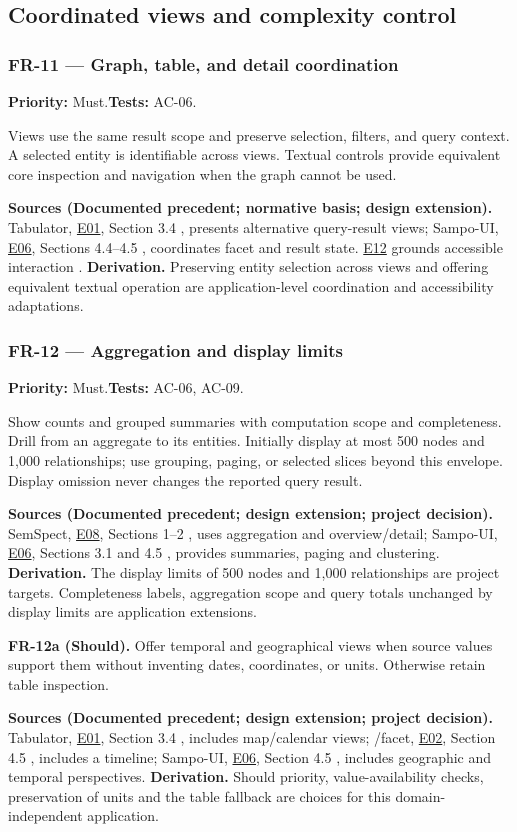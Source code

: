 \documentclass[11pt,a4paper]{article}
\newcommand{\req}[4]{\subsubsection*{#1 --- #2}\phantomsection\label{req:#1}\textbf{Priority:} #3.\quad\textbf{Tests:} #4.\par}
\newcommand{\origin}[3]{\par{\small\textbf{Sources (#1).} #2 \textbf{Derivation.} #3\par}}
\newcommand{\evidence}[1]{\hyperlink{evidence:#1}{#1}}
\begin{document}
\subsection{Coordinated views and complexity control}
\par\noindent\begin{minipage}{\linewidth}
\req{FR-11}{Graph, table, and detail coordination}{Must}{AC-06}
Views use the same result scope and preserve selection, filters, and query context. A selected entity is identifiable across views. Textual controls provide equivalent core inspection and navigation when the graph cannot be used.
\origin{Documented precedent; normative basis; design extension}{Tabulator, \evidence{E01}, Section 3.4 \citep{tabulator}, presents alternative query-result views; Sampo-UI, \evidence{E06}, Sections 4.4--4.5 \citep{sampoui}, coordinates facet and result state. \evidence{E12} grounds accessible interaction \citep{wcag}.}{Preserving entity selection across views and offering equivalent textual operation are application-level coordination and accessibility adaptations.}
\end{minipage}\par
\par\noindent\begin{minipage}{\linewidth}
\req{FR-12}{Aggregation and display limits}{Must}{AC-06, AC-09}
Show counts and grouped summaries with computation scope and completeness. Drill from an aggregate to its entities. Initially display at most 500 nodes and 1,000 relationships; use grouping, paging, or selected slices beyond this envelope. Display omission never changes the reported query result.
\origin{Documented precedent; design extension; project decision}{SemSpect, \evidence{E08}, Sections 1--2 \citep{semspect}, uses aggregation and overview/detail; Sampo-UI, \evidence{E06}, Sections 3.1 and 4.5 \citep{sampoui}, provides summaries, paging and clustering.}{The display limits of 500 nodes and 1,000 relationships are project targets. Completeness labels, aggregation scope and query totals unchanged by display limits are application extensions.}
\end{minipage}\par
\par\noindent\begin{minipage}{\linewidth}
\textbf{FR-12a (Should).} Offer temporal and geographical views when source values support them without inventing dates, coordinates, or units. Otherwise retain table inspection.
\origin{Documented precedent; design extension; project decision}{Tabulator, \evidence{E01}, Section 3.4 \citep{tabulator}, includes map/calendar views; /facet, \evidence{E02}, Section 4.5 \citep{facet}, includes a timeline; Sampo-UI, \evidence{E06}, Section 4.5 \citep{sampoui}, includes geographic and temporal perspectives.}{Should priority, value-availability checks, preservation of units and the table fallback are choices for this domain-independent application.}
\end{minipage}\par
\end{document}
